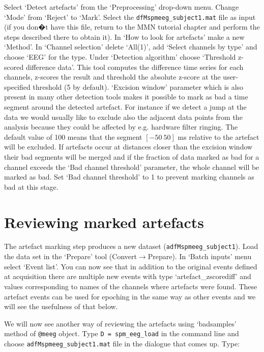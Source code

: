 Select `Detect artefacts' from the `Preprocessing' drop-down menu. Change `Mode' from `Reject' to `Mark'. Select the \texttt{dfMspmeeg\_subject1.mat} file as input (if you don�t have this file, return to the MMN tutorial chapter and perform the steps described there to obtain it). In `How to look for artefacts' make a new `Method'. In `Channel selection' delete `All(1)', add `Select channels by type' and choose `EEG' for the type. Under `Detection algorithm' choose `Threshold z-scored difference data'. This tool computes the difference time series for each channels, z-scores the result and threshold the absolute z-score at the user-specified threshold (5 by default).  `Excision window' parameter which is also present in many other detection tools makes it possible to mark as bad a time segment around the detected artefact. For instance if we detect a jump at the data we would usually like to exclude also the adjacent data points from the analysis because they could be affected by e.g. hardware filter ringing. The default value of 100 means that the segment $[-50\ 50]$ ms relative to the artefact will be excluded. If artefacts occur at distances closer than the excision window their bad segments will be merged and if the fraction of data marked as bad for a channel exceeds the `Bad channel threshold' parameter, the whole channel will be marked as bad. Set `Bad channel threshold' to 1 to prevent marking channels as bad at this stage.

\section{Reviewing marked artefacts}

The artefact marking step produces a new dataset (\texttt{adfMspmeeg\_subject1}). Load the data set in the `Prepare' tool (Convert$\rightarrow$Prepare).  In `Batch inputs' menu select `Event list'. You can now see that in addition to the original events defined at acquisition there are multiple new events with type `artefact\_zscorediff' and values corresponding to names of the channels where artefacts were found. These artefact events can be used for epoching in the same way as other events and we will see the usefulness of that below. 

We will now see another way of reviewing the artefacts using `badsamples' method of \texttt{@meeg} object. Type \texttt{D = spm\_eeg\_load} in the command line and choose \texttt{adfMspmeeg\_subject1.mat} file in the dialogue that comes up. Type:

